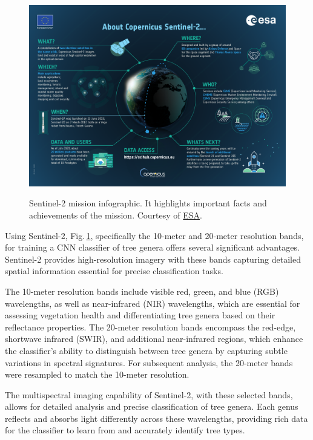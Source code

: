 \begin{figure}[ht]
    \centering
    \href{https://sentinels.copernicus.eu/documents/247904/4180891/Sentinel-2-infographic.pdf}
    {\includegraphics[width=0.98\linewidth]{figures/figures_sentinel/Sentinel-2-infographic.pdf}}
    \caption{Sentinel-2 mission infographic. It highlights important facts and achievements of the mission. Courtesy of \href{https://sentinels.copernicus.eu/web/sentinel/missions/sentinel-2}{ESA}.
    }
    \label{fig:sentinel2_info}
\end{figure}

Using Sentinel-2, Fig.\,\ref{fig:sentinel2_info}, specifically the 10-meter and 20-meter resolution bands, for training a CNN classifier of tree genera offers several significant advantages. Sentinel-2 provides high-resolution imagery with these bands capturing detailed spatial information essential for precise classification tasks.

The 10-meter resolution bands include visible red, green, and blue (RGB) wavelengths, as well as near-infrared (NIR) wavelengths, which are essential for assessing vegetation health and differentiating tree genera based on their reflectance properties. The 20-meter resolution bands encompass the red-edge, shortwave infrared (SWIR), and additional near-infrared regions, which enhance the classifier's ability to distinguish between tree genera by capturing subtle variations in spectral signatures. For subsequent analysis, the 20-meter bands were resampled to match the 10-meter resolution.

The multispectral imaging capability of Sentinel-2, with these selected bands, allows for detailed analysis and precise classification of tree genera. Each genus reflects and absorbs light differently across these wavelengths, providing rich data for the classifier to learn from and accurately identify tree types.

